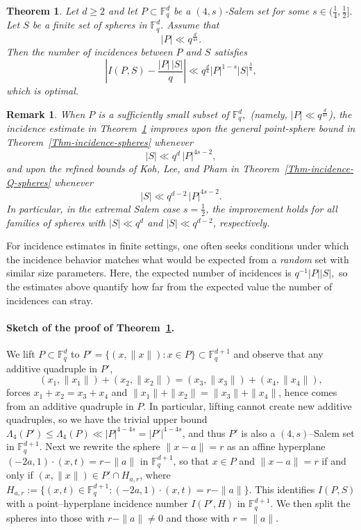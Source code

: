 \documentclass{article}
\newtheorem{theorem}{Theorem}[section]
\newtheorem{remark}{Remark}[section]
\begin{document}
\begin{theorem}\label{thm1}
Let $d \ge 2$ and let $P \subset \mathbb{F}_q^d$ be a $(4,s)$-Salem set for some $s \in \big(\frac{1}{4}, \frac{1}{2} \big]$. Let $S$ be a finite set of spheres in $\mathbb{F}_q^d$.
Assume that
\[
|P| \ll q^{\frac{d}{4s}}.
\]
Then the number of incidences between $P$ and $S$ satisfies
\[
\left| I(P,S) - \frac{|P| \,|S|}{q} \right|
\ll q^{\frac{d}{4}} |P|^{1-s} |S|^{\frac{3}{4}},
\]
which is optimal.
\end{theorem}


\begin{remark}
\label{rem:compare-KLXY}
When $P$ is a sufficiently small subset of $\mathbb F_q^d,$ (namely, $|P| \ll q^{\frac{d}{4s}}$), the incidence estimate in Theorem~\ref{thm1} improves upon the general point-sphere bound in Theorem~\ref{Thm-incidence-spheres} whenever
\[
|S|\ll q^{d}\,|P|^{4s-2},
\]
and upon the refined bounds of Koh, Lee, and Pham in Theorem~\ref{Thm-incidence-Q-spheres} whenever
\[
|S|\ll q^{d-2}\,|P|^{4s-2}.
\]
In particular, in the extremal Salem case $s=\tfrac12$, the improvement holds for all families of spheres with $|S|\ll q^{d}$ and $|S|\ll q^{d-2}$, respectively.
\end{remark}

For incidence estimates in finite settings, one often seeks conditions under which the incidence behavior matches what would be expected from a \emph{random} set with similar size parameters. Here, the expected number of incidences is $q^{-1}|P||S|,$ so the estimates above quantify how far from the expected value the number of incidences can stray.






\paragraph*{Sketch of the proof of Theorem~\ref{thm1}.}
We lift $P\subset\mathbb{F}_q^d$ to $P'=\{(x,\|x\|):x\in P\}\subset\mathbb{F}_q^{d+1}$ and observe that any additive quadruple in $P'$,
\[
(x_1,\|x_1\|)+(x_2,\|x_2\|)=(x_3,\|x_3\|)+(x_4,\|x_4\|),
\]
forces $x_1+x_2=x_3+x_4$ and $\|x_1\|+\|x_2\|=\|x_3\|+\|x_4\|$, hence comes from an additive quadruple in $P$. 
In particular, lifting cannot create new additive quadruples, so we have the trivial upper bound $\Lambda_4(P')\le\Lambda_4(P)\ll|P|^{4-4s}=|P'|^{4-4s}$, and thus $P'$ is also a $(4,s)$–Salem set in $\mathbb{F}_q^{d+1}$. 
Next we rewrite the sphere $\|x-a\|=r$ as an affine hyperplane $(-2a,1)\cdot(x,t)=r-\|a\|$ in $\mathbb{F}_q^{d+1}$, so that $x\in P$ and $\|x-a\|=r$ if and only if $(x,\|x\|)\in P'\cap H_{a,r}$, where $H_{a,r}:= \{(x,t) \in \mathbb{F}_q^{d+1} : (-2a,1) \cdot (x,t) = r - \|a\|\}$. 
This identifies $I(P,S)$ with a point–hyperplane incidence number $I(P',H)$ in $\mathbb{F}_q^{d+1}$. We then split the spheres into those with $r-\|a\|\neq 0$ and those with $r=\|a\|$. 
\end{document}
